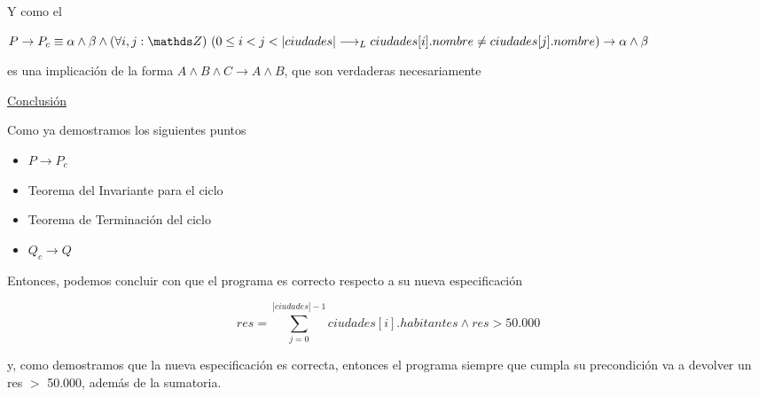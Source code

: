 \documentclass[10pt,a4paper]{article}
\begin{document}
\begin {enumerate}
    Y como el 
    
    $P \to P_{c} \equiv \alpha \land \beta \land \paraTodo[unalinea]{i, j}{\ent}{0 \leq i < j < |ciudades| \implicaLuego ciudades[i].nombre \neq ciudades[j].nombre}  \to \alpha \land \beta$
    
    es una implicación de la forma $A \land B \land C \to A \land B$, que son verdaderas necesariamente

    \underline{Conclusión}

    Como ya demostramos los siguientes puntos
    \begin{itemize}
        \item $P \to P_{c}$
        \item Teorema del Invariante para el ciclo
        \item Teorema de Terminación del ciclo
        \item $Q_{c} \to Q$
    \end{itemize}
    
    Entonces, podemos concluir con que el programa es correcto respecto a su nueva especificación 
    
    $$res=\sum\limits_{j = 0}^{|ciudades| - 1}{ciudades[i].habitantes} \land res > 50.000$$

    y, como demostramos que la nueva especificación es  correcta, entonces el programa siempre que cumpla su precondición va a devolver un
    res $>$ 50.000, además de la sumatoria.



\end{enumerate}
\end{document}
